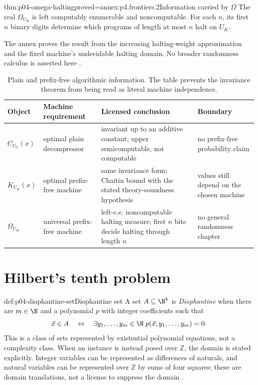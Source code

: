\begin{hbtheorem}{thm:p04-omega-halting}{proved=annex:p4.frontiers.2}{Information carried by \(\Omega\)}
The real \(\Omega_{U_K}\) is left computably enumerable and noncomputable.
For each \(n\), its first \(n\) binary digits determine which programs of
length at most \(n\) halt on \(U_K\).
\end{hbtheorem}

The annex proves the result from the increasing halting-weight approximation
and the fixed machine's undecidable halting domain.  No broader randomness
calculus is asserted here \cite{Chaitin1975,LiVitanyi2008}.

\begin{table}[htbp]
\centering
\small
\begin{tabular}{@{}p{}p{}p{}p{}@{}}
\toprule
Object & Machine requirement & Licensed conclusion & Boundary \\
\midrule
\(C_{U_C}(x)\) & optimal plain decompressor & invariant up to an additive
constant; upper semicomputable, not computable & no prefix-free probability
claim \\
\(K_{U_K}(x)\) & optimal prefix-free machine & same invariance form; Chaitin
bound with the stated theory-soundness hypothesis & values still depend on
the chosen machine \\
\(\Omega_{U_K}\) & universal prefix-free machine & left-c.e. noncomputable
halting measure; first \(n\) bits decide halting through length \(n\) & no
general randomness chapter \\
\bottomrule
\end{tabular}
\caption{Plain and prefix-free algorithmic information.
The table prevents the invariance theorem from being read as literal machine
independence.}
\label{tab:p04-kolmogorov-boundaries}
\end{table}

\section{Hilbert's tenth problem}
\label{sec:p04-mrdp}

\begin{hbdefinition}{def:p04-diophantine-set}{Diophantine set}
A set \(A\subseteq\N^k\) is \emph{Diophantine} when there are
\(m\in\N\) and a polynomial \(p\) with integer coefficients such that
\[
 \vec x\in A\quad\Leftrightarrow\quad
 \exists y_1,\ldots,y_m\in\N\;
 p(\vec x,y_1,\ldots,y_m)=0.
\]
This is a class of sets represented by existential polynomial equations, not
a complexity class.  When an instance is instead posed over \(\mathbb Z\),
the domain is stated explicitly.  Integer variables can be represented as
differences of naturals, and natural variables can be represented over
\(\mathbb Z\) by sums of four squares; these are domain translations, not a
license to suppress the domain \cite{Davis1973}.
\end{hbdefinition}

